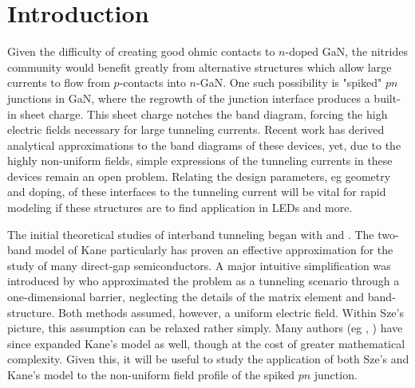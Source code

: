\section{Introduction}
Given the difficulty of creating good ohmic contacts to $n$-doped GaN, the nitrides community would benefit greatly from alternative structures which allow large currents to flow from $p$-contacts into $n$-GaN.  One such possibility is "spiked" $pn$ junctions in GaN, where the regrowth of the junction interface produces a built-in sheet charge.  This sheet charge notches the band diagram, forcing the high electric fields necessary for large tunneling currents.  Recent work has derived analytical approximations to the band diagrams of these devices, yet, due to the highly non-uniform fields, simple expressions of the tunneling currents in these devices remain an open problem.  Relating the design parameters, eg geometry and doping, of these interfaces to the tunneling current will be vital for rapid modeling if these structures are to find application in LEDs and more.

The initial theoretical studies of interband tunneling began with \cite{Keldysh_1958} and \cite{Kane_1960}.  The two-band model of Kane particularly has proven an effective approximation for the study of many direct-gap semiconductors.  A major intuitive simplification was introduced by \cite{Sze_2nd} who approximated the problem as a tunneling scenario through a one-dimensional barrier, neglecting the details of the matrix element and band-structure.  Both methods assumed, however, a uniform electric field. Within Sze's picture, this assumption can be relaxed rather simply.  Many authors (eg \cite{Takayanagi_1991}, \cite{Tanaka_1994}) have since expanded Kane's model as well, though at the cost of greater mathematical complexity.  Given this, it will be useful to study the application of both Sze's and Kane's model to the non-uniform field profile of the spiked $pn$ junction.